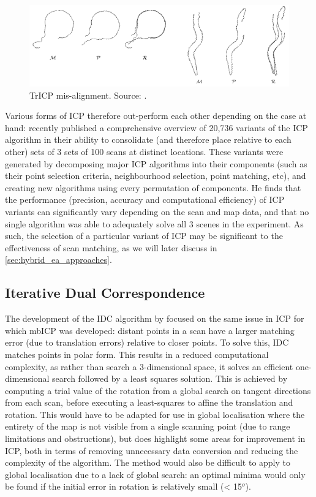 \documentclass[authoryearcitations]{UoYCSproject}
\begin{document}
\begin{figure}[t]
	\centering
	\includegraphics[width=\textwidth,keepaspectratio]{images/trICP_misalignment.png}
	\caption[TrICP mis-alignment]{TrICP mis-alignment. Source: \citet{Chetverikov2005-yz}.}
	\label{fig:trICP_misalignment}
\end{figure}

Various forms of ICP therefore out-perform each other depending on the case at hand: \citet{Donoso2017-wp} recently published a comprehensive overview of 20,736 variants of the ICP algorithm in their ability to consolidate (and therefore place relative to each other) sets of 3 sets of 100 scans at distinct locations. These variants were generated by decomposing major ICP algorithms into their components (such as their point selection criteria, neighbourhood selection, point matching, etc), and creating new algorithms using every permutation of components. He finds that the performance (precision, accuracy and computational efficiency) of ICP variants can significantly vary depending on the scan and map data, and that no single algorithm was able to adequately solve all 3 scenes in the experiment. As such, the selection of a particular variant of ICP may be significant to the effectiveness of scan matching, as we will later discuss in \autoref{sec:hybrid_ea_approaches}.


\subsection{Iterative Dual Correspondence}

The development of the IDC algorithm by \citet{Lu1997-zv} focused on the same issue in ICP for which mbICP was developed: distant points in a scan have a larger matching error (due to translation errors) relative to closer points. To solve this, IDC matches points in polar form. This results in a reduced computational complexity, as rather than search a 3-dimensional space, it solves an efficient one-dimensional search followed by a least squares solution. This is achieved by computing a trial value of the rotation from a global search on tangent directions from each scan, before executing a least-squares to affine the translation and rotation. This would have to be adapted for use in global localisation where the entirety of the map is not visible from a single scanning point (due to range limitations and obstructions), but does highlight some areas for improvement in ICP, both in terms of removing unnecessary data conversion and reducing the complexity of the algorithm. The method would also be difficult to apply to global localisation due to a lack of global search: an optimal minima would only be found if the initial error in rotation is relatively small (< 15$^o$).
\end{document}

